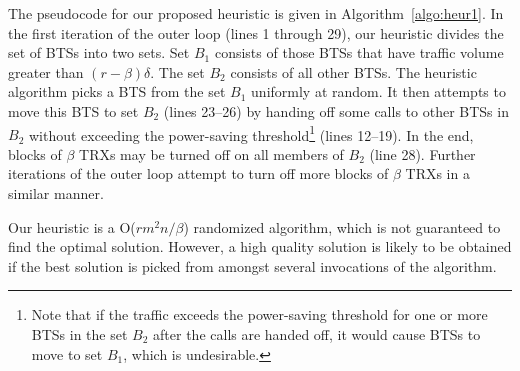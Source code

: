 The pseudocode for our proposed heuristic is given in Algorithm~\ref{algo:heur1}. In the first iteration of the outer loop (lines 1 through 29), our heuristic divides the set of BTSs into two sets.
Set $B_1$ consists of those BTSs that have traffic volume greater than $(r-\beta)\delta$. The set $B_2$ consists of all other BTSs.
The heuristic algorithm picks a BTS from the set $B_1$ uniformly at random.
It then attempts to move this BTS to set $B_2$ (lines 23--26) by handing off some calls to other BTSs in $B_2$ without exceeding the power-saving threshold\footnote{Note that if the traffic exceeds the power-saving threshold for one or more BTSs in the set $B_2$ after the calls are handed off, it would cause BTSs to move to set $B_1$, which is undesirable.} (lines 12--19).
In the end, blocks of $\beta$ TRXs may be turned off on all members of $B_2$ (line 28).
Further iterations of the outer loop attempt to turn off more blocks of $\beta$ TRXs in a similar manner.

Our heuristic is a O($rm^2n/\beta$) randomized algorithm, which is not guaranteed to find the optimal solution. However, a high quality solution is likely to be obtained if the best solution is picked from amongst several invocations of the algorithm.

